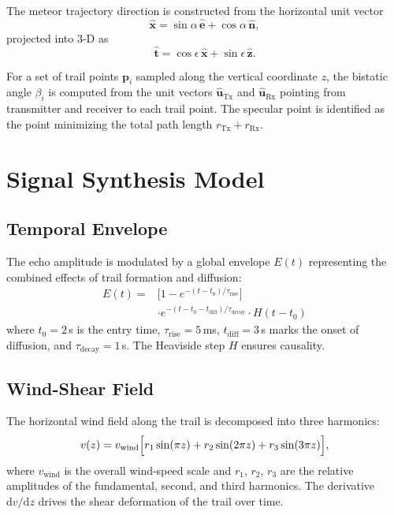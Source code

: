 \documentclass[a4paper,11pt]{article}
\begin{document}
The meteor trajectory direction is constructed from the horizontal unit vector
\begin{equation}
    \hat{\mathbf{x}} = \sin\alpha\,\hat{\mathbf{e}} + \cos\alpha\,\hat{\mathbf{n}},
\end{equation}
projected into 3-D as
\begin{equation}
    \hat{\mathbf{t}} = \cos\epsilon\,\hat{\mathbf{x}} + \sin\epsilon\,\hat{\mathbf{z}}.
\end{equation}

For a set of trail points $\mathbf{p}_i$ sampled along the vertical coordinate $z$, the bistatic angle $\beta_i$ is computed from the unit vectors $\hat{\mathbf{u}}_{\mathrm{Tx}}$ and $\hat{\mathbf{u}}_{\mathrm{Rx}}$ pointing from transmitter and receiver to each trail point. The specular point is identified as the point minimizing the total path length $r_{\mathrm{Tx}} + r_{\mathrm{Rx}}$.

\section{Signal Synthesis Model}

\subsection{Temporal Envelope}

The echo amplitude is modulated by a global envelope $E(t)$ representing the combined effects of trail formation and diffusion:
\begin{equation}
\begin{aligned}
    E(t) = {} & \bigl[1 - e^{-(t-t_0)/\tau_{\mathrm{rise}}}\bigr] \\
              & \cdot e^{-(t-t_0-t_{\mathrm{diff}})/\tau_{\mathrm{decay}}} \cdot H(t-t_0)
\end{aligned}
\end{equation}
where $t_0 = 2\,$s is the entry time, $\tau_{\mathrm{rise}} = 5\,$ms, $t_{\mathrm{diff}} = 3\,$s marks the onset of diffusion, and $\tau_{\mathrm{decay}} = 1\,$s. The Heaviside step $H$ ensures causality.

\subsection{Wind-Shear Field}

The horizontal wind field along the trail is decomposed into three harmonics:
\begin{equation}
    v(z) = v_{\mathrm{wind}} \Bigl[ r_1 \sin(\pi z) + r_2 \sin(2\pi z) + r_3 \sin(3\pi z) \Bigr],
\end{equation}
where $v_{\mathrm{wind}}$ is the overall wind-speed scale and $r_1$, $r_2$, $r_3$ are the relative amplitudes of the fundamental, second, and third harmonics. The derivative $\mathrm{d}v/\mathrm{d}z$ drives the shear deformation of the trail over time.
\end{document}
